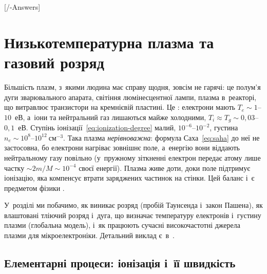 

\graphicspath{{\currfilebase/Pictures}}

[\currfilebase/\currfilebase-Answers]
\chapter{Низькотемпературна плазма та газовий розряд}\label{sec:discharge}\hypertarget{discharge}{}

Більшість плазм, з~якими людина має справу щодня, зовсім не гарячі: це полум'я дуги
зварювального апарата, світіння люмінесцентної лампи, плазма в~реакторі, що витравлює
транзистори на кремнієвій пластині. Це : електрони мають
$T_e\sim1$--$10$~еВ, а~іони та нейтральний газ лишаються майже холодними,
$T_i\approx T_g\sim0{,}03$--$0{,}1$~еВ. Ступінь іонізації~\eqref{eq:ionization-degree} малий,
$10^{-6}$--$10^{-2}$, густина $n_e\sim10^{8}$--$10^{12}~\mathrm{см}^{-3}$. Така плазма
\emph{нерівноважна}: формула Саха~\eqref{eq:saha} до неї не застосовна, бо електрони
нагріває зовнішнє поле, а~енергію вони віддають нейтральному газу повільно (у~пружному
зіткненні електрон передає атому лише частку $\sim2m/M\sim10^{-4}$ своєї енергії).
Плазма живе доти, доки поле підтримує іонізацію, яка компенсує втрати заряджених
частинок на стінки. Цей баланс і~є предметом фізики .

У~розділі ми побачимо, як виникає розряд (пробій Таунсенда і~закон Пашена), як
влаштовані тліючий розряд і~дуга, що визначає температуру електронів і~густину плазми
(глобальна модель), і~як працюють сучасні високочастотні джерела плазми для мікроелектроніки.
Детальний виклад є~в~\cite{lieberman2005principles,raizer1991gas,chen2003lecture}.

\section{Елементарні процеси: іонізація і~її швидкість}\label{sec:ionization-rate}

